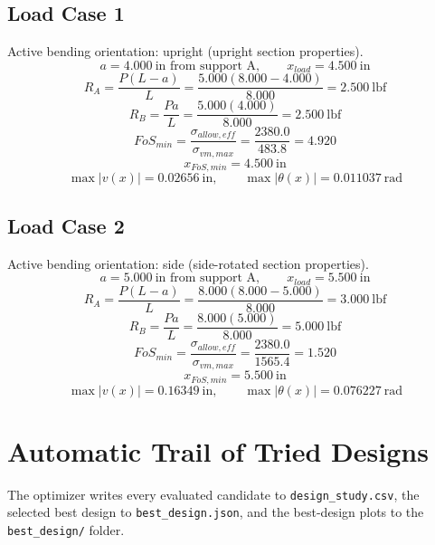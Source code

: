 \documentclass[11pt]{article}
\begin{document}
\subsection*{Load Case 1}
Active bending orientation: upright (upright section properties).
\[a = 4.000\ \mathrm{in} \text{ from support A}, \qquad x_{load} = 4.500\ \mathrm{in}\]
\[R_A = \frac{P(L-a)}{L} = \frac{5.000(8.000-4.000)}{8.000} = 2.500\ \mathrm{lbf}\]
\[R_B = \frac{Pa}{L} = \frac{5.000(4.000)}{8.000} = 2.500\ \mathrm{lbf}\]
\[FoS_{min} = \frac{\sigma_{allow,eff}}{\sigma_{vm,max}} = \frac{2380.0}{483.8} = 4.920\]
\[x_{FoS,min} = 4.500\ \mathrm{in}\]
\[\max |v(x)| = 0.02656\ \mathrm{in}, \qquad \max |\theta(x)| = 0.011037\ \mathrm{rad}\]
\subsection*{Load Case 2}
Active bending orientation: side (side-rotated section properties).
\[a = 5.000\ \mathrm{in} \text{ from support A}, \qquad x_{load} = 5.500\ \mathrm{in}\]
\[R_A = \frac{P(L-a)}{L} = \frac{8.000(8.000-5.000)}{8.000} = 3.000\ \mathrm{lbf}\]
\[R_B = \frac{Pa}{L} = \frac{8.000(5.000)}{8.000} = 5.000\ \mathrm{lbf}\]
\[FoS_{min} = \frac{\sigma_{allow,eff}}{\sigma_{vm,max}} = \frac{2380.0}{1565.4} = 1.520\]
\[x_{FoS,min} = 5.500\ \mathrm{in}\]
\[\max |v(x)| = 0.16349\ \mathrm{in}, \qquad \max |\theta(x)| = 0.076227\ \mathrm{rad}\]

\section*{Automatic Trail of Tried Designs}
The optimizer writes every evaluated candidate to \texttt{design\_study.csv}, the selected best design to \texttt{best\_design.json}, and the best-design plots to the \texttt{best\_design/} folder.
\end{document}
